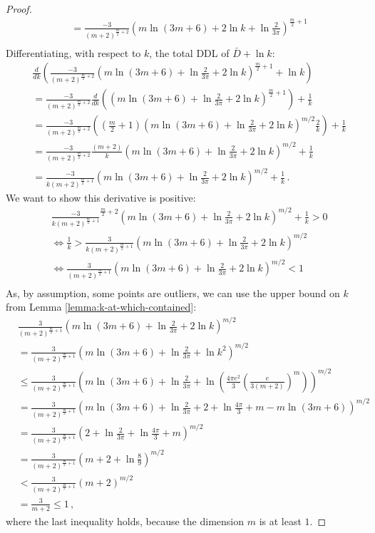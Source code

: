 \documentclass[a4paper,fleqn]{cas-sc}
\theoremstyle{remark}
\begin{document}
\begin{proof}
\begin{align*}
            &= \frac{-3}{(m+2)^{\frac{m}{2}+2}} \left(m\ln{(3m+6)} + 2 \ln{k} + \ln{\tfrac{2}{3\pi}} \right)^{\frac{m}{2}+1} \\
\end{align*}
Differentiating, with respect to $k$, the total DDL of $\bar{D} + \ln{k}$:
\begin{align*}
    &\frac{d}{dk}\left(\frac{-3}{(m+2)^{\frac{m}{2}+2}}(m \ln{(3m+6)}+\ln{\tfrac{2}{3\pi}}+2\ln{k})^{\frac{m}{2}+1} + \ln{k}\right) \\
    &=\frac{-3}{(m+2)^{\frac{m}{2}+2}}\frac{d}{dk}\left((m \ln{(3m+6)}+\ln{\tfrac{2}{3\pi}}+2\ln{k})^{\frac{m}{2}+1}\right) + \frac{1}{k} \\
    &=\frac{-3}{(m+2)^{\frac{m}{2}+2}}\left((\frac{m}{2}+1)(m \ln{(3m+6)}+\ln{\tfrac{2}{3\pi}}+2\ln{k})^{m/2}\frac{2}{k}\right) + \frac{1}{k} \\
    &=\frac{-3}{(m+2)^{\frac{m}{2}+2}}\frac{(m+2)}{k}\left(m \ln{(3m+6)}+\ln{\tfrac{2}{3\pi}}+2\ln{k}\right)^{m/2} + \frac{1}{k} \\
    &=\frac{-3}{k(m+2)^{\frac{m}{2}+1}}\left(m \ln{(3m+6)}+\ln{\tfrac{2}{3\pi}}+2\ln{k}\right)^{m/2} + \frac{1}{k} \,.
\end{align*}
We want to show this derivative is positive:
\begin{align*}
    &\frac{-3}{k(m+2)^{\frac{m}{2}+1}}^{\frac{m}{2}+2}\left(m \ln{(3m+6)}+\ln{\tfrac{2}{3\pi}}+2\ln{k}\right)^{m/2} + \frac{1}{k} > 0\\
    &\iff \frac{1}{k} > \frac{3}{k(m+2)^{\frac{m}{2}+1}}\left(m \ln{(3m+6)}+\ln{\tfrac{2}{3\pi}}+2\ln{k}\right)^{m/2}\\
    &\iff \frac{3}{(m+2)^{\frac{m}{2}+1}}\left(m \ln{(3m+6)}+\ln{\tfrac{2}{3\pi}}+2\ln{k}\right)^{m/2} < 1\\
\end{align*}
As, by assumption, some points are outliers, we can use the upper bound on $k$ from Lemma \ref{lemma:k-at-which-contained}:
\begin{align*}
    &\frac{3}{(m+2)^{\frac{m}{2}+1}}\left(m \ln{(3m+6)}+\ln{\tfrac{2}{3\pi}}+2\ln{k}\right)^{m/2} \\
    &= \frac{3}{(m+2)^{\frac{m}{2}+1}}\left(m \ln{(3m+6)}+\ln{\tfrac{2}{3\pi}}+\ln{k^2}\right)^{m/2} \\
    &\leq \frac{3}{(m+2)^{\frac{m}{2}+1}}\left(m \ln{(3m+6)}+\ln{\tfrac{2}{3\pi}}+\ln{\left(\frac{4\pi e^2}{3}\left(\frac{e}{3(m+2)}\right)^m\right)}\right)^{m/2} \\
    &= \frac{3}{(m+2)^{\frac{m}{2}+1}}\left(m \ln{(3m+6)} + \ln{\tfrac{2}{3\pi}} + 2 + \ln{\tfrac{4\pi}{3}} + m - m\ln{(3m+6)}\right)^{m/2} \\
    &= \frac{3}{(m+2)^{\frac{m}{2}+1}}\left(2 + \ln{\tfrac{2}{3\pi}} + \ln{\tfrac{4\pi}{3}} + m\right)^{m/2} \\
    &= \frac{3}{(m+2)^{\frac{m}{2}+1}}\left(m + 2 + \ln{\tfrac{8}{9}}\right)^{m/2} \\
    &< \frac{3}{(m+2)^{\frac{m}{2}+1}}(m + 2)^{m/2} \\
    &= \frac{3}{m+2} \leq 1 \,,
\end{align*}
where the last inequality holds, because the dimension $m$ is at least $1$.
\end{proof}
\end{document}

